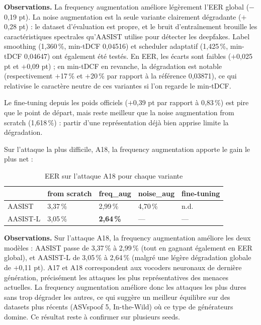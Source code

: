 \documentclass[10pt, a4paper]{article}
\begin{document}
\noindent\textbf{Observations.} La frequency augmentation améliore légèrement l'EER global ($-$0,19 pt). La noise augmentation est la seule variante clairement dégradante ($+$0,28 pt) : le dataset d'évaluation est propre, et le bruit d'entraînement brouille les caractéristiques spectrales qu'AASIST utilise pour détecter les deepfakes. Label smoothing (1,360\,\%, min-tDCF 0,04516) et scheduler adaptatif (1,425\,\%, min-tDCF 0,04647) ont également été testés. En EER, les écarts sont faibles ($+$0,025 pt et $+$0,09 pt) ; en min-tDCF en revanche, la dégradation est notable (respectivement $+$17\,\% et $+$20\,\% par rapport à la référence 0,03871), ce qui relativise le caractère neutre de ces variantes si l'on regarde le min-tDCF.

Le fine-tuning depuis les poids officiels ($+$0,39 pt par rapport à 0,83\,\%) est pire que le point de départ, mais reste meilleur que la noise augmentation from scratch (1,618\,\%) : partir d'une représentation déjà bien apprise limite la dégradation.

Sur l'attaque la plus difficile, A18, la frequency augmentation apporte le gain le plus net :

\begin{table}[H]
\centering\small
\caption{EER sur l'attaque A18 pour chaque variante}
\begin{tabular}{@{}lllll@{}}
\toprule
 & from scratch & freq\_aug & noise\_aug & fine-tuning \\
\midrule
AASIST   & 3,37\,\% & 2,99\,\% & 4,70\,\% & n.d. \\
AASIST-L & 3,05\,\% & \textbf{2,64\,\%} & --- & --- \\
\bottomrule
\end{tabular}
\end{table}

\noindent\textbf{Observations.} Sur l'attaque A18, la frequency augmentation améliore les deux modèles : AASIST passe de 3,37\,\% à 2,99\,\% (tout en gagnant également en EER global), et AASIST-L de 3,05\,\% à 2,64\,\% (malgré une légère dégradation globale de $+$0,11 pt). A17 et A18 correspondent aux vocoders neuronaux de dernière génération, précisément les attaques les plus représentatives des menaces actuelles. La frequency augmentation améliore donc les attaques les plus dures sans trop dégrader les autres, ce qui suggère un meilleur équilibre sur des datasets plus récents (ASVspoof 5, In-the-Wild) où ce type de générateurs domine. Ce résultat reste à confirmer sur plusieurs seeds.
\end{document}
